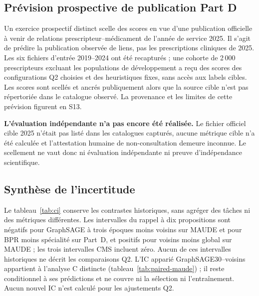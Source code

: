 \subsection{Prévision prospective de publication Part D}
\label{sec:q2-forecast}

Un exercice prospectif distinct scelle des scores en vue d'une publication officielle à venir de relations prescripteur--médicament de l'année de service 2025. Il s'agit de prédire la publication observée de liens, pas les prescriptions cliniques de 2025. Les six fichiers d'entrée 2019--2024 ont été recapturés ; une cohorte de 2\,000 prescripteurs excluant les populations de développement a reçu des scores des configurations Q2 choisies et des heuristiques fixes, sans accès aux labels cibles. Les scores sont scellés et ancrés publiquement alors que la source cible n'est pas répertoriée dans le catalogue observé\cite{hgbq2forecast}. La provenance et les limites de cette prévision figurent en S13.

\textbf{L'évaluation indépendante n'a pas encore été réalisée.} Le fichier officiel cible 2025 n'était pas listé dans les catalogues capturés, aucune métrique cible n'a été calculée et l'attestation humaine de non-consultation demeure inconnue. Le scellement ne vaut donc ni évaluation indépendante ni preuve d'indépendance scientifique.
\subsection{Synthèse de l'incertitude}

Le tableau~\ref{tab:ci} conserve les contrastes historiques, sans agréger des tâches ni des métriques différentes. Les intervalles du rappel à dix propositions sont négatifs pour GraphSAGE à trois époques moins voisins sur MAUDE et pour BPR moins spécialité sur Part~D, et positifs pour voisins moins global sur MAUDE ; les trois intervalles CMS incluent zéro. Aucun de ces intervalles historiques ne décrit les comparaisons Q2. L'IC apparié GraphSAGE30--voisins appartient à l'analyse C distincte (tableau~\ref{tab:paired-maude}) ; il reste conditionnel à ses prédictions et ne couvre ni la sélection ni l'entraînement. Aucun nouvel IC n'est calculé pour les ajustements Q2.

